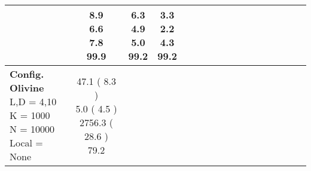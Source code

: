 \documentclass[9pt]{article}
\begin{document}
\begin{landscape}
\begin{longtable}{ l | c c c c | c c c c | c c c c | c c c c |}
             &
                            \makecell{              8.9
     \\
            {\footnotesize             6.6
    } \\  {\footnotesize             7.8
     } \\
            {\small \textcolor[rgb]{ 0.202 , 0.699 , 0.1} {99.9  }
} }
             &                         \makecell{              6.3
     \\
            {\footnotesize             4.9
    } \\  {\footnotesize             5.0
     } \\
            {\small \textcolor[rgb]{ 0.216 , 0.685 , 0.1} {99.2  }
} }
             &
                            \makecell{              \textbf{ 3.3 }
     \\
            {\footnotesize             \textbf{ 2.2 }
    } \\  {\footnotesize             4.3
     } \\
            {\small \textcolor[rgb]{ 0.216 , 0.685 , 0.1} {99.2  }
} }
            

 \\
                                                            
                    \hline
                    \makecell{ \textbf{ Config. Olivine} \\
                    { \small L,D = 4,10} \\
                    {\small K = 1000} \\
                    {\small N = 10000 } \\ {\small Local = None }} &
                    
                            \makecell{              47.1
     (             8.3
    ) \\
            {\footnotesize             5.0
     (              4.5
     )} \\
            {\footnotesize             2756.3
     (            28.6
    ) } \\
            {\small  \textcolor[rgb]{ 0.616 , 0.285 , 0.1} {79.2  }
} }



\end{longtable}
\end{landscape}
\end{document}
